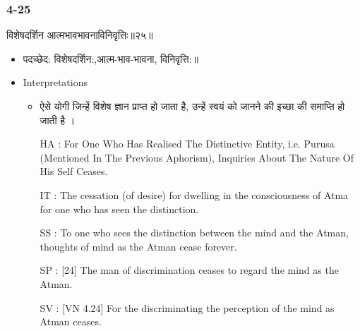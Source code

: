 \begin{frame}[fragile]\frametitle{4-25}
\begin{sanskrit}
विशेषदर्शिन आत्मभावभावनाविनिवृत्तिः॥२५॥
\end{sanskrit}

	\begin{itemize}
	\item पदच्छेद: विशेषदर्शिन:,आत्म-भाव-भावना, विनिवृत्ति:॥
	\item Interpretations
		\begin{itemize}	
		\item  ऐसे योगी जिन्हें विशेष ज्ञान प्राप्त हो जाता है, उन्हें स्वयं को जानने की इच्छा की समाप्ति हो जाती है ।
		\item [HA]: For One Who Has Realised The Distinctive Entity, i.e. Purusa (Mentioned In The Previous Aphorism), Inquiries About The Nature Of His Self Ceases.
		\item [IT]: The cessation (of desire) for dwelling in the consciousness of Atma for one who has seen the distinction.
		\item [SS]: To one who sees the distinction between the mind and the Atman, thoughts of mind as the Atman cease forever.
		\item [SP]: [24] The man of discrimination ceases to regard the mind as the Atman.
		\item [SV]: [VN 4.24] For the discriminating the perception of the mind as Atman ceases. 
		\end{itemize}
	\end{itemize}
\end{frame}


